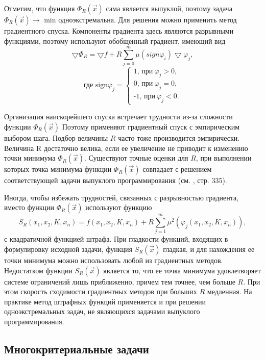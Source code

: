 {Отметим, что функция $\Phi_{R}(\vec{x})$ сама является выпуклой, поэтому задача  $\Phi_{R}(\vec{x}) \rightarrow$ min одноэкстремальна. Для решения можно применить метод градиентного спуска. Компоненты градиента здесь являются разрывными функциями, поэтому используют обобщенный градиент, имеющий вид
\begin{equation*}
\bigtriangledown \Phi_{R} = \bigtriangledown f + R\sum_{j=0}^{m}\mu (sign \varphi_{i})\bigtriangledown \varphi_{j},
\end{equation*}
\begin{equation*}
\textrm{где sign} \varphi_{j} =
\begin{cases}
\textrm{1, при}\: \varphi_{j} > 0, \\
\textrm{0, при}\: \varphi_{j} = 0, \\
\textrm{-1, при}\: \varphi_{j} < 0.
\end{cases}
\end{equation*}

Организация наискорейшего спуска встречает трудности из-за сложности функции $\Phi_{R}(\vec{x})$ Поэтому применяют градиентный спуск  с  эмпирическим выбором шага. Подбор  величины $R$ часто тоже производится эмпирически. Величина R достаточно велика,  если ее увеличение не приводит к изменению точки минимума  $\Phi_{R}(\vec{x})$. Существуют точные оценки для $R$, при выполнении которых точка минимума функции $\Phi_{R}(\vec{x})$ совпадает с решением соответствующей задачи выпуклого программирования (см. \cite{literature_lyashenko}, стр. 335).

Иногда, чтобы избежать трудностей, связанных с разрывностью градиента, вместо функции $\Phi_{R}(\vec{x})$  используют функцию
\begin{equation*}
S_{R} (x_{1}, x_{2}, K, x_{n}) = f(x_{1}, x_{2}, K, x_{n}) + R\sum_{j=1}^{m}\mu^{2}(\varphi_{j}(x_{1}, x_{2}, K, x_{n})),
\end{equation*}
с квадратичной функцией штрафа. При гладкости функций, входящих в формулировку исходной задачи, функция $S_{R}(\vec{x})$ гладкая, и для нахождения ее точки минимума можно использовать любой из градиентных методов. Недостатком функции $S_{R}(\vec{x})$ является то, что ее точка минимума удовлетворяет системе ограничений лишь приближенно, причем тем точнее, чем больше $R$. При этом скорость сходимости градиентных методов при больших $R$ медленная. На практике метод штрафных функций применяется и при решении одноэкстремальных задач, не являющихся задачами выпуклого программирования.

\subsection{Многокритериальные задачи}

}
